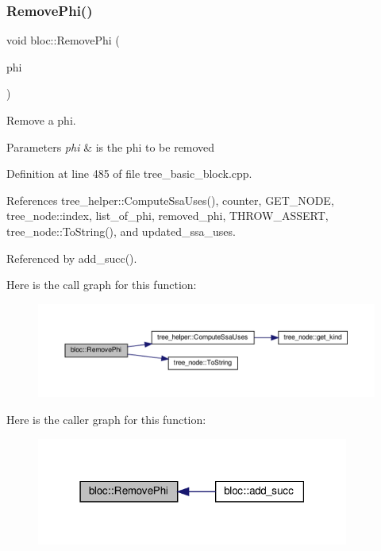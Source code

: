 \subsubsection{\texorpdfstring{Remove\+Phi()}{RemovePhi()}}
{\footnotesize\ttfamily void bloc\+::\+Remove\+Phi (\begin{DoxyParamCaption}\item[{const \hyperlink{tree__node_8hpp_a6ee377554d1c4871ad66a337eaa67fd5}{tree\+\_\+node\+Ref}}]{phi }\end{DoxyParamCaption})}



Remove a phi. 


\begin{DoxyParams}{Parameters}
{\em phi} & is the phi to be removed \\
\hline
\end{DoxyParams}


Definition at line 485 of file tree\+\_\+basic\+\_\+block.\+cpp.



References tree\+\_\+helper\+::\+Compute\+Ssa\+Uses(), counter, G\+E\+T\+\_\+\+N\+O\+DE, tree\+\_\+node\+::index, list\+\_\+of\+\_\+phi, removed\+\_\+phi, T\+H\+R\+O\+W\+\_\+\+A\+S\+S\+E\+RT, tree\+\_\+node\+::\+To\+String(), and updated\+\_\+ssa\+\_\+uses.



Referenced by add\+\_\+succ().

Here is the call graph for this function\+:
\nopagebreak
\begin{figure}[H]
\begin{center}
\leavevmode
\includegraphics[width=350pt]{d6/df6/structbloc_a4ab8511befd9fc1846b99c4bc980c716_cgraph}
\end{center}
\end{figure}
Here is the caller graph for this function\+:
\nopagebreak
\begin{figure}[H]
\begin{center}
\leavevmode
\includegraphics[width=291pt]{d6/df6/structbloc_a4ab8511befd9fc1846b99c4bc980c716_icgraph}
\end{center}
\end{figure}
\mbox{\label{structbloc_a9193321bf36b0bcbd263406ea0021ff4}} 
